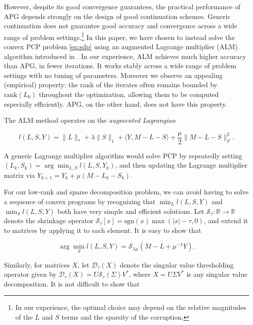 However, despite its good convergence guarantees, the practical performance of APG depends strongly on the design of good continuation schemes. Generic continuation does not guarantee good accuracy and convergence across a wide range of problem settings.\footnote{In our experience, the optimal choice may depend on the relative magnitudes of the $L$ and $S$ terms and the sparsity of the corruption.} In this paper, we have chosen to instead solve the convex PCP problem
\eqref{eq:sdp} using an augmented Lagrange multiplier (ALM) algorithm introduced in \cite{Lin2009-ALM,Yuan2009}. In our experience, ALM achieves much higher accuracy than APG, in fewer iterations. It works stably across a wide range of problem settings with no tuning of parameters. Moreover we observe an appealing (empirical) property: the rank of the iterates often remains bounded by $\mathrm{rank}(L_0)$
throughout the optimization, allowing them to be computed especially efficiently. APG, on the other hand, does not have this property.

The ALM method operates on the {\em augmented Lagrangian}

\begin{equation}
l(L,S,Y) = \| L \|_* + \lambda \| S \|_1 + \langle Y, M-L-S\rangle +
\dfrac{\mu}{2}\|M-L-S\|_F^2.
\end{equation}

A generic Lagrange multiplier algorithm \cite{Bertsekas-LM} would solve PCP by repeatedly setting $(L_k,S_k) = \arg \min_{L,S}
l(L,S,Y_k)$, and then updating the Lagrange multiplier matrix via $Y_{k+1} = Y_{k} + \mu(M - L_k- S_k)$.

For our low-rank and sparse decomposition problem, we can avoid having to solve a sequence of convex programs by recognizing that $\min_L
l(L,S,Y)$ and $\min_S l(L,S,Y)$ both have very simple and efficient solutions. Let $\mathcal{S}_\tau : \mathbb{R} \to \mathbb{R}$ denote the shrinkage operator $\mathcal{S}_\tau[x] = \textrm{sgn}(x) \max( |x|-\tau,
0 )$, and extend it to matrices by applying it to each element. It is easy to show that

\begin{equation}
\arg \min\limits_S l(L,S,Y) = \mathcal{S}_{\lambda \mu}(M-L+\mu^{-1} Y).
\end{equation}

Similarly, for matrices $X$, let $\mathcal{D}_\tau(X)$ denote the singular value thresholding operator given by $\mathcal{D}_\tau(X) = U \mathcal{S}_\tau(\Sigma) V^*$, where $X = U \Sigma V^*$ is any singular value decomposition. It is not difficult to show that

